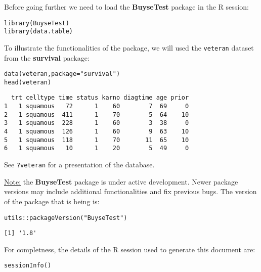 \documentclass[12pt]{article}
\begin{document}
\clearpage

Before going further we need to load the \textbf{BuyseTest} package in the R
session:
\lstset{language=r,label= ,caption= ,captionpos=b,numbers=none}
\begin{lstlisting}
library(BuyseTest)
library(data.table)
\end{lstlisting}

To illustrate the functionalities of the package, we will used the
\texttt{veteran} dataset from the \textbf{survival} package:
\lstset{language=r,label= ,caption= ,captionpos=b,numbers=none}
\begin{lstlisting}
data(veteran,package="survival")
head(veteran)
\end{lstlisting}

\begin{verbatim}
  trt celltype time status karno diagtime age prior
1   1 squamous   72      1    60        7  69     0
2   1 squamous  411      1    70        5  64    10
3   1 squamous  228      1    60        3  38     0
4   1 squamous  126      1    60        9  63    10
5   1 squamous  118      1    70       11  65    10
6   1 squamous   10      1    20        5  49     0
\end{verbatim}

See \texttt{?veteran} for a presentation of the database.

\bigskip

\uline{Note:} the \textbf{BuyseTest} package is under active development. Newer
package versions may include additional functionalities and fix
previous bugs. The version of the package that is being is:
\lstset{language=r,label= ,caption= ,captionpos=b,numbers=none}
\begin{lstlisting}
utils::packageVersion("BuyseTest")
\end{lstlisting}

\begin{verbatim}
[1] '1.8'
\end{verbatim}

For completness, the details of the R session used to generate this
document are:
\lstset{language=r,label= ,caption= ,captionpos=b,numbers=none}
\begin{lstlisting}
sessionInfo()
\end{lstlisting}
\end{document}
